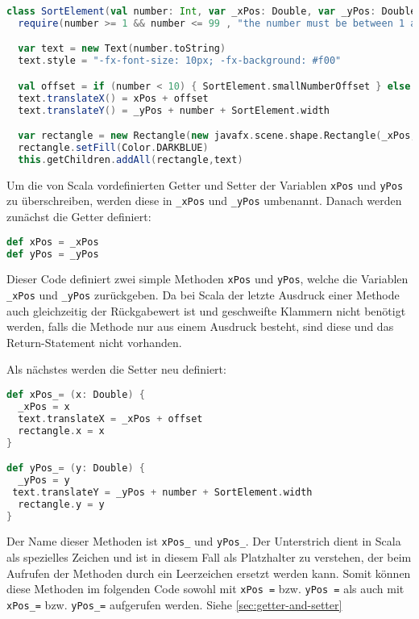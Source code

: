 \begin{lstlisting}[language=Scala,caption=Kopf der SortElement Klasse]
class SortElement(val number: Int, var _xPos: Double, var _yPos: Double) extends Group with Ordered[SortElement]  {
  require(number >= 1 && number <= 99 , "the number must be between 1 and 99 (inclusive)")

  var text = new Text(number.toString)
  text.style = "-fx-font-size: 10px; -fx-background: #f00"

  val offset = if (number < 10) { SortElement.smallNumberOffset } else { 0 }
  text.translateX() = xPos + offset
  text.translateY() = _yPos + number + SortElement.width

  var rectangle = new Rectangle(new javafx.scene.shape.Rectangle(_xPos, _yPos, SortElement.width, number))
  rectangle.setFill(Color.DARKBLUE)
  this.getChildren.addAll(rectangle,text)
\end{lstlisting}

Um die von Scala vordefinierten Getter und Setter der Variablen \texttt{xPos} und \texttt{yPos} zu überschreiben, werden diese in \texttt{\_xPos} und
\texttt{\_yPos} umbenannt. Danach werden zunächst die Getter definiert:

\begin{lstlisting}[language=Scala,caption=Definiert die Setter Methoden]
def xPos = _xPos
def yPos = _yPos
\end{lstlisting}

Dieser Code definiert zwei simple Methoden \texttt{xPos} und \texttt{yPos}, welche die Variablen \texttt{\_xPos} und \texttt{\_yPos} zurückgeben. Da bei Scala der letzte Ausdruck einer Methode auch gleichzeitig der Rückgabewert ist und geschweifte Klammern nicht benötigt werden, falls die Methode nur aus einem Ausdruck besteht, sind diese und das Return-Statement nicht vorhanden.

Als nächstes werden die Setter neu definiert:

\begin{lstlisting}[language=Scala,caption=Setter Methoden]
def xPos_= (x: Double) {
  _xPos = x
  text.translateX = _xPos + offset
  rectangle.x = x
}

def yPos_= (y: Double) {
  _yPos = y
 text.translateY = _yPos + number + SortElement.width
  rectangle.y = y
}
\end{lstlisting}

Der Name dieser Methoden ist \texttt{xPos\_} und \texttt{yPos\_}. Der Unterstrich dient in Scala als spezielles Zeichen und ist in diesem Fall als Platzhalter zu verstehen, der beim Aufrufen der Methoden durch ein Leerzeichen ersetzt werden kann. Somit können diese Methoden im folgenden Code sowohl mit \texttt{xPos =}  bzw. \texttt{yPos =} als auch mit \texttt{xPos\_=} bzw. \texttt{yPos\_=} aufgerufen werden. Siehe \ref{sec:getter-and-setter}

